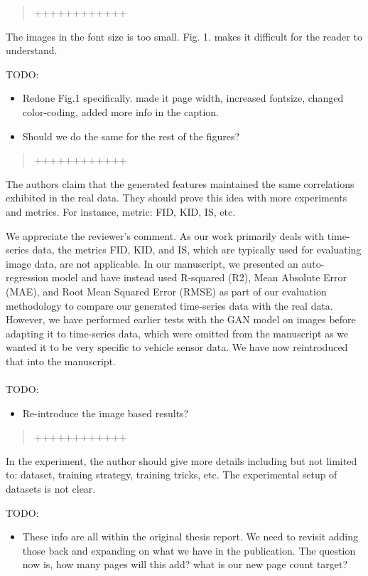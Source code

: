 \documentclass{article}
\begin{document}
\begin{quote}
	++++++++++++
\end{quote}

\RC The images in the font size is too small. Fig. 1. makes it difficult for the reader to understand.

\AR TODO: 
\begin{itemize}
    \item Redone Fig.1 specifically. made it page width, increased fontsize, changed color-coding, added more info in the caption.
    \item Should we do the same for the rest of the figures?
\end{itemize}

\begin{quote}
	++++++++++++
\end{quote}

\RC The authors claim that the generated features maintained the same correlations exhibited in the real data. They should prove this idea with more experiments and metrics. For instance, metric: FID, KID, IS, etc.

\AR We appreciate the reviewer's comment. As our work primarily deals with time-series data, the metrics FID, KID, and IS, which are typically used for evaluating image data, are not applicable. In our manuscript, we presented an auto-regression model and have instead used R-squared (R2), Mean Absolute Error (MAE), and Root Mean Squared Error (RMSE) as part of our evaluation methodology to compare our generated time-series data with the real data. However, we have performed earlier tests with the GAN model on images before adapting it to time-series data, which were omitted from the manuscript as we wanted it to be very specific to vehicle sensor data. We have now reintroduced that into the manuscript.
\\
\\
TODO: 
\begin{itemize}
    \item Re-introduce the image based results?
\end{itemize}

\begin{quote}
	++++++++++++
\end{quote}

\RC In the experiment, the author should give more details including but not limited to: dataset, training strategy, training tricks, etc. The experimental setup of datasets is not clear.

\AR TODO: 
\begin{itemize}
    \item These info are all within the original thesis report. We need to revisit adding those back and expanding on what we have in the publication. The question now is, how many pages will this add? what is our new page count target?
\end{itemize}
\end{document}
